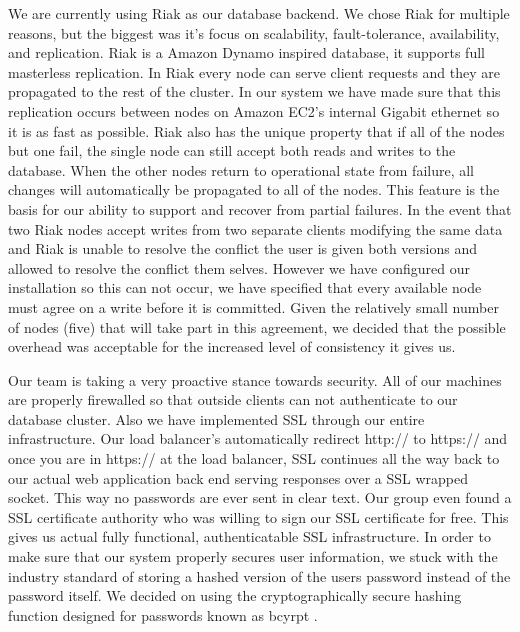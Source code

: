 \documentclass{dependencies/acm_proc_article-sp}
\begin{document}
We are currently using Riak as our database backend. We chose Riak for multiple
reasons, but the biggest was it's focus on  scalability, fault-tolerance,
availability, and replication. Riak is a Amazon Dynamo \cite{dynamo} inspired
database, it supports full masterless replication. In Riak every node can
serve client requests and they are propagated to the rest of the cluster.
In our system we have made sure that this replication occurs between nodes
on Amazon EC2's internal Gigabit ethernet so it is as fast as possible. Riak
also has the unique property that if all of the nodes but one fail, the single
node can still accept both reads and writes to the database. When the other
nodes return to operational state from failure, all changes will automatically
be propagated to all of the nodes. This feature is the basis for our ability to
support and recover from partial failures. In the event that two Riak nodes accept
writes from two separate clients modifying the same data and Riak is unable
to resolve the conflict the user is given both versions and allowed to resolve
the conflict them selves. However we have configured our installation so this
can not occur, we have specified that every available node must agree on a
write before it is committed. Given the relatively small number of nodes (five)
that will take part in this agreement, we decided that the possible overhead
was acceptable for the increased level of consistency it gives us.

Our team is taking a very proactive stance towards security. All of our machines are properly firewalled so that
outside clients can not authenticate to our database cluster. Also we have implemented SSL through our entire infrastructure.
Our load balancer's automatically redirect http:// to https:// and once you are in https:// at the load balancer, SSL continues all the
way back to our actual web application back end serving responses over a SSL wrapped socket. This way no passwords are ever
sent in clear text. Our group even found a SSL certificate authority who was willing to sign our SSL certificate for free. This gives
us actual fully functional, authenticatable SSL infrastructure. In order to make sure that our system properly secures user information,
we stuck with the industry standard of storing a hashed version of the users password instead of the password itself. We decided on using
the cryptographically secure hashing function designed for passwords known as bcyrpt \cite{bcrypt}.

%

%
%
\balancecolumns
\end{document}
